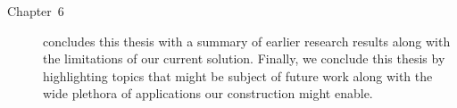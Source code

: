 \begin{description}
 \item[Chapter~6] concludes this thesis with a summary of earlier research results along with the limitations of our current solution. Finally, we conclude this thesis by highlighting topics that might be subject of future work along with the wide plethora of applications our construction might enable.

\end{description}

